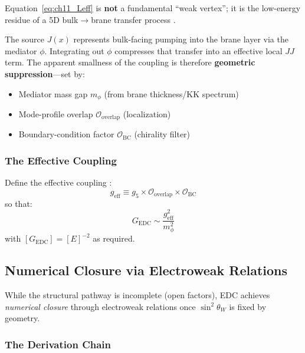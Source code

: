 \begin{tcolorbox}[edcCornerstone, title=\textbf{Physical Interpretation (Canonical)}]
Equation~\eqref{eq:ch11_Leff} is \textbf{not} a fundamental ``weak vertex'';
it is the low-energy residue of a 5D bulk$\to$brane transfer process \tagDc{}.

The source $J(x)$ represents bulk-facing pumping into the brane layer via the
mediator $\phi$. Integrating out $\phi$ compresses that transfer into an
effective local $JJ$ term. The apparent smallness of the coupling is therefore
\textbf{geometric suppression}---set by:
\begin{itemize}[nosep]
    \item Mediator mass gap $m_\phi$ (from brane thickness/KK spectrum)
    \item Mode-profile overlap $\mathcal{O}_{\text{overlap}}$ (localization)
    \item Boundary-condition factor $\mathcal{O}_{\text{BC}}$ (chirality filter)
\end{itemize}
\end{tcolorbox}

\subsubsection{The Effective Coupling}

Define the effective coupling \tagP{}:
\begin{equation}
    g_{\text{eff}} \equiv g_5 \times \mathcal{O}_{\text{overlap}}
    \times \mathcal{O}_{\text{BC}}
    \label{eq:ch11_geff}
\end{equation}
so that:
\begin{equation}
    \boxed{
    G_{\text{EDC}} \sim \frac{g_{\text{eff}}^2}{m_\phi^2}
    }
    \label{eq:ch11_GEDC}
\end{equation}
with $[G_{\text{EDC}}] = [E]^{-2}$ as required.

\subsection{Numerical Closure via Electroweak Relations}
\label{sec:ch11_numerical}

While the structural pathway is incomplete (open factors), EDC achieves
\emph{numerical closure} through electroweak relations once $\sin^2\theta_W$ is
fixed by geometry.

\subsubsection{The Derivation Chain}

